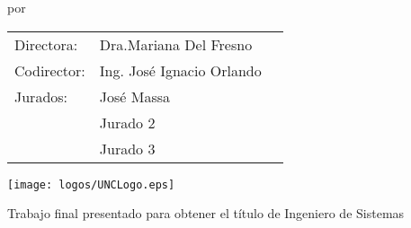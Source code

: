 \begin{titlepage}

\begin{center}

\vspace*{2\bigskipamount}

{\makeatletter
\titlestyle\color{tudelft-dark-blue}\LARGE\@title
\makeatother}

{\makeatletter
\ifx\@subtitle\undefined\else
    \bigskip
    \titlefont\titleshape\LARGE\@subtitle
\fi
\makeatother}

\bigskip
\bigskip

por

\bigskip
\bigskip

{\makeatletter
\titlefont\Large\bfseries\@author
\makeatother}
\vfill
\begin{tabular}{lll}
    Directora: & Dra.Mariana Del Fresno \\
    Codirector: & Ing. José Ignacio Orlando \\
    Jurados:
        & José Massa \\
        & Jurado 2 \\
        & Jurado 3
\end{tabular}


\bigskip
\bigskip
\bigskip
\bigskip

\texttt{[image: logos/UNCLogo.eps]}
\bigskip
\bigskip


\vfill

Trabajo final presentado para obtener el título de Ingeniero de Sistemas

\bigskip
\bigskip

\bigskip
\bigskip

\bigskip
\bigskip

\end{center}

\end{titlepage}

